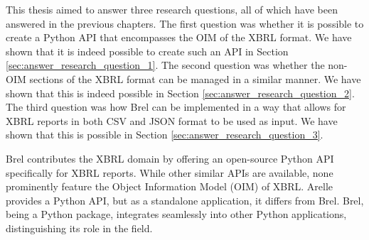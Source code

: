 
This thesis aimed to answer three research questions, all of which have been answered in the previous chapters.
The first question was whether it is possible to create a Python API that encompasses the OIM of the XBRL format.
We have shown that it is indeed possible to create such an API in Section \ref{sec:answer_research_question_1}.
The second question was whether the non-OIM sections of the XBRL format can be managed in a similar manner.
We have shown that this is indeed possible in Section \ref{sec:answer_research_question_2}.
The third question was how Brel can be implemented in a way that allows for XBRL reports in both CSV and JSON format to be used as input.
We have shown that this is possible in Section \ref{sec:answer_research_question_3}.

Brel contributes the XBRL domain by offering an open-source Python API specifically for XBRL reports.
While other similar APIs are available, none prominently feature the Object Information Model (OIM) of XBRL.
Arelle provides a Python API, but as a standalone application, it differs from Brel.
Brel, being a Python package, integrates seamlessly into other Python applications, distinguishing its role in the field.

